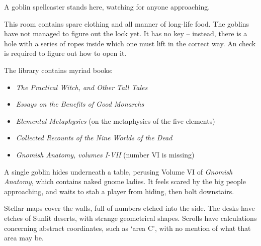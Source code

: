 \begin{multicols}{2}

A goblin spellcaster stands here, watching for anyone approaching.

\goblincaster

\showStdSpells


This room contains spare clothing and all manner of long-life food.
The goblins have not managed to figure out the lock yet.
It has no key -- instead, there is a hole with a series of ropes inside which one must lift in the correct way.
An  check \tn[10] is required to figure out how to open it.



The library contains myriad books:

\begin{itemize}
  \item
  \textit{The Practical Witch, and Other Tall Tales}
  \item
  \textit{Essays on the Benefits of Good Monarchs}
  \item
  \textit{Elemental Metaphysics}
  (on the metaphysics of the five elements)
  \item
  \textit{Collected Recounts of the Nine Worlds of the Dead}
  \item
  \textit{Gnomish Anatomy, volumes I-VII}
  (number VI is missing)
\end{itemize}

\noindent
A single goblin hides underneath a table, perusing Volume VI of \textit{Gnomish Anatomy}, which contains naked gnome ladies.
It feels scared by the big people approaching, and waits to stab a player from hiding, then bolt downstairs.

\begin{boxtext}

  Stellar maps cover the walls, full of numbers etched into the side.
  The desks have etches of Sunlit deserts, with strange geometrical shapes.
  Scrolls have calculations concerning abstract coordinates, such as `area C', with no mention of what that area may be.

\end{boxtext}


\end{multicols}
